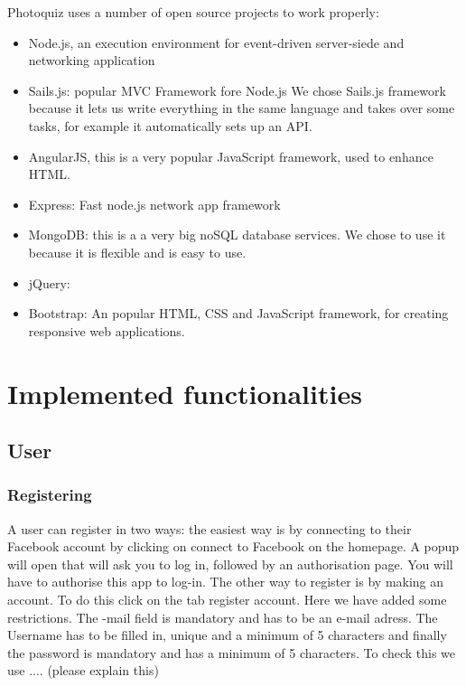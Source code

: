 \documentclass[11pt, oneside]{article}   	%
\begin{document}
Photoquiz uses a number of open source projects to work properly:
\begin{itemize}
\item Node.js, an execution environment for event-driven server-siede and networking application
\item Sails.js: popular MVC Framework fore Node.js We chose Sails.js framework because it lets us write everything in the same language and takes over some tasks, for example it automatically sets up an API.
\item AngularJS, this is a very popular JavaScript framework, used to enhance HTML.
\item Express: Fast node.js network app framework
\item MongoDB: this is a a very big noSQL database services. We chose to use it because it is flexible and is easy to use.
\item jQuery: 
\item Bootstrap: An popular HTML, CSS and JavaScript framework, for creating responsive web applications. 
\end{itemize}



\section{Implemented functionalities}
\subsection{User}
\subsubsection{Registering}

A user can register in two ways: the easiest way is by connecting to their Facebook account by clicking on connect to Facebook on the homepage. A popup will open that will ask you to log in, followed by an authorisation page. You will have to authorise this app to log-in.
The other way to register is by making an account. To do this click on the tab register account. Here we have added some restrictions. The -mail field is mandatory and has to be an e-mail adress. The Username has to be filled in, unique and a minimum of 5 characters and finally the password is mandatory and has a minimum of 5 characters.
To check this we use .... (please explain this) \\
\end{document}
